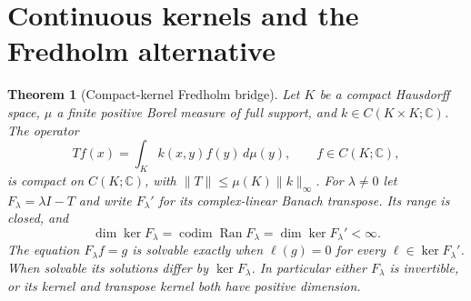 \documentclass[11pt,oneside,openany]{book}
\theoremstyle{plain}
\newtheorem{theorem}{Theorem}[chapter]
\theoremstyle{definition}
\theoremstyle{remark}
\begin{document}
\section{Continuous kernels and the Fredholm alternative}\label{pde:I01}

\begin{theorem}[Compact-kernel Fredholm bridge]\label{thm:pde-fredholm-kernel}
Let \(K\) be a compact Hausdorff space, \(\mu\) a finite positive
Borel measure of full support, and \(k\in C(K\times K;\mathbb C)\).
The operator
\[
 Tf(x)=\int_K k(x,y)f(y)\,d\mu(y),\qquad f\in C(K;\mathbb C),
\]
is compact on \(C(K;\mathbb C)\), with
\(\|T\|\leq\mu(K)\|k\|_\infty\).
For \(\lambda\ne0\) let \(F_\lambda=\lambda I-T\) and write
\(F_\lambda'\) for its complex-linear Banach transpose.
Its range is closed, and
\[
 \dim\ker F_\lambda
     =\operatorname{codim}\operatorname{Ran}F_\lambda
     =\dim\ker F_\lambda'<\infty .
\]
The equation \(F_\lambda f=g\) is solvable exactly when
\(\ell(g)=0\) for every \(\ell\in\ker F_\lambda'\).
When solvable its solutions differ by \(\ker F_\lambda\).
In particular either \(F_\lambda\) is invertible, or its kernel
and transpose kernel both have positive dimension.
\end{theorem}
\end{document}

